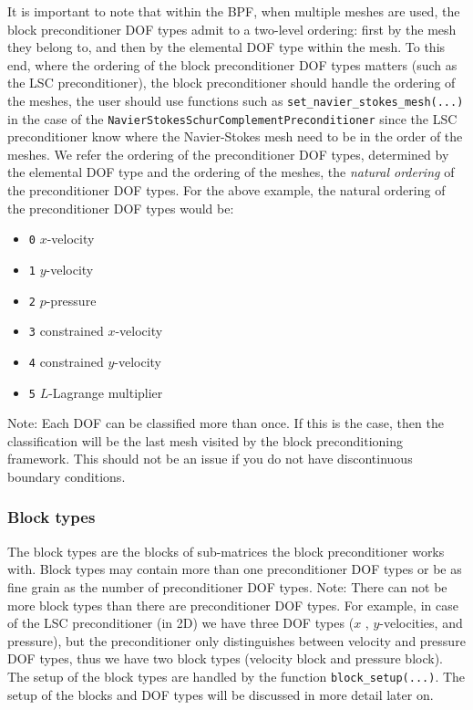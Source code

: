 It is important to note that within the BPF, when multiple meshes are used, the
block preconditioner DOF types admit to a two-level ordering: first by the mesh 
they belong to, and then by the elemental DOF type within the mesh. To this end, 
where the ordering of the block preconditioner DOF types matters (such as the 
LSC preconditioner), the block preconditioner should handle the ordering of the 
meshes, the user should use functions such as 
\texttt{set\_\allowbreak navier\_\allowbreak stokes\_\allowbreak mesh(...)}
in the case of the 
\texttt{Navier\allowbreak Stokes\allowbreak Schur\allowbreak Complement\allowbreak Preconditioner} 
since the LSC preconditioner know where the Navier-Stokes mesh need to be in 
the order of the meshes. We refer the ordering of the preconditioner DOF types, 
determined by the elemental DOF type and the ordering of the meshes, the 
\emph{natural ordering} of the preconditioner DOF types. For the above example, 
the natural ordering of the preconditioner DOF
types would be:
\begin{itemize}
 \item \verb+0+ $x$-velocity
 \item \verb+1+ $y$-velocity
 \item \verb+2+ $p$-pressure
 \item \verb+3+ constrained $x$-velocity
 \item \verb+4+ constrained $y$-velocity
 \item \verb+5+ $L$-Lagrange multiplier
\end{itemize}
Note: Each DOF can be classified more than once. If this is the case, then the 
classification will be the last mesh visited by the block preconditioning 
framework. This should not be an issue if you do not have discontinuous 
boundary conditions.

\subsubsection{Block types}
The block types are the blocks of sub-matrices the block preconditioner works 
with. Block types may contain more than one preconditioner DOF types or be as 
fine grain as the number of preconditioner DOF types. Note: There can not be 
more block types than there are preconditioner DOF types. For example, in case 
of the LSC preconditioner (in 2D) we have three DOF types ($x$ , $y$-velocities, 
and pressure), but the preconditioner only distinguishes between velocity and 
pressure DOF types, thus we have two block types (velocity block and pressure 
block). The setup of the block types are handled by the function 
\verb+block_setup(...)+. The setup of the blocks and DOF types will be 
discussed in more detail later on.


